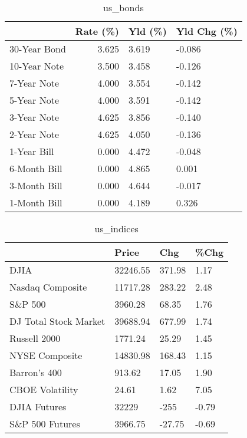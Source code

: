 \documentclass{article}%
\begin{document}
%


\begin{table}[htbp]%
\caption{us\_bonds}%
\centering%
\begin{adjustbox}{width=1\textwidth}%
\begin{tabular}{lrll}
\toprule
             &  Rate (\%) & Yld (\%) & Yld Chg (\%) \\
\midrule
30-Year Bond &     3.625 &   3.619 &      -0.086 \\
10-Year Note &     3.500 &   3.458 &      -0.126 \\
 7-Year Note &     4.000 &   3.554 &      -0.142 \\
 5-Year Note &     4.000 &   3.591 &      -0.142 \\
 3-Year Note &     4.625 &   3.856 &      -0.140 \\
 2-Year Note &     4.625 &   4.050 &      -0.136 \\
 1-Year Bill &     0.000 &   4.472 &      -0.048 \\
6-Month Bill &     0.000 &   4.865 &       0.001 \\
3-Month Bill &     0.000 &   4.644 &      -0.017 \\
1-Month Bill &     0.000 &   4.189 &       0.326 \\
\bottomrule
\end{tabular}
%
\end{adjustbox}%
\end{table}

%


\begin{table}[htbp]%
\caption{us\_indices}%
\centering%
\begin{adjustbox}{width=1\textwidth}%
\begin{tabular}{llll}
\toprule
                      &    Price &    Chg &  \%Chg \\
\midrule
                 DJIA & 32246.55 & 371.98 &  1.17 \\
     Nasdaq Composite & 11717.28 & 283.22 &  2.48 \\
              S\&P 500 &  3960.28 &  68.35 &  1.76 \\
DJ Total Stock Market & 39688.94 & 677.99 &  1.74 \\
         Russell 2000 &  1771.24 &  25.29 &  1.45 \\
       NYSE Composite & 14830.98 & 168.43 &  1.15 \\
         Barron's 400 &   913.62 &  17.05 &  1.90 \\
      CBOE Volatility &    24.61 &   1.62 &  7.05 \\
         DJIA Futures &    32229 &   -255 & -0.79 \\
      S\&P 500 Futures &  3966.75 & -27.75 & -0.69 \\
\bottomrule
\end{tabular}
%
\end{adjustbox}%
\end{table}
\end{document}
